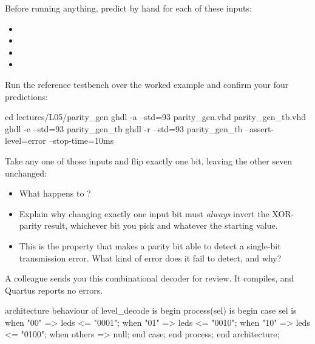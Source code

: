 \begin{parts}
  \item Before running anything, predict  by hand for each of these inputs:
    \begin{itemize}
      \item {}
      \item {}
      \item {}
      \item {}
    \end{itemize}
  \item Run the reference testbench over the worked example and confirm your four predictions:
\begin{shell}
cd lectures/L05/parity_gen
ghdl -a --std=93 parity_gen.vhd parity_gen_tb.vhd
ghdl -e --std=93 parity_gen_tb
ghdl -r --std=93 parity_gen_tb --assert-level=error --stop-time=10ms
\end{shell}
  \item Take any one of those inputs and flip exactly one bit, leaving the other seven unchanged:
    \begin{itemize}
      \item What happens to ?
      \item Explain why changing exactly one input bit must \emph{always} invert the XOR-parity
        result, whichever bit you pick and whatever the starting value.
      \item This is the property that makes a parity bit able to detect a single-bit transmission
        error. What kind of error does it fail to detect, and why?
    \end{itemize}
\end{parts}

\label{c5:ex:7}
A colleague sends you this combinational decoder for review. It compiles, and Quartus reports no
errors.

\begin{vhdlcode}
architecture behaviour of level_decode is
begin
    process(sel) is
    begin
        case sel is
            when "00"   => leds <= "0001";
            when "01"   => leds <= "0010";
            when "10"   => leds <= "0100";
            when others => null;
        end case;
    end process;
end architecture;
\end{vhdlcode}

